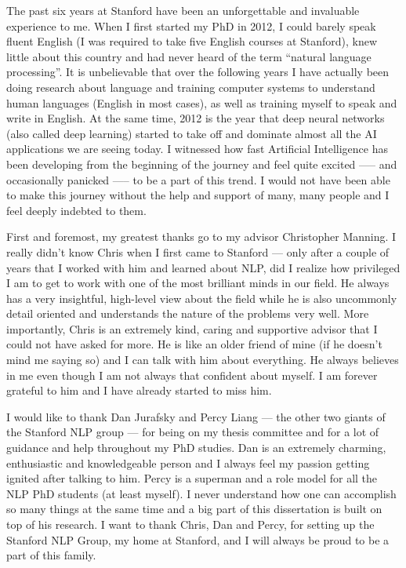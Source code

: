 

The past six years at Stanford have been an unforgettable and invaluable experience to me. When I first started my PhD in 2012, I could barely speak fluent English (I was required to take five English courses at Stanford), knew little about this country and had never heard of the term ``natural language processing''.  It is unbelievable that over the following years I have actually been doing research about language and training computer systems to understand human languages (English in most cases), as well as training myself to speak and write in English. At the same time, 2012 is the year that deep neural networks (also called deep learning) started to take off and dominate almost all the AI applications we are seeing today. I witnessed how fast Artificial Intelligence has been developing from the beginning of the journey and feel quite excited —-- and occasionally panicked —-- to be a part of this trend. I would not have been able to make this journey without the help and support of many, many people and I feel deeply indebted to them.

First and foremost, my greatest thanks go to my advisor Christopher Manning. I really didn't know Chris when I first came to Stanford --- only after a couple of years that I worked with him and learned about NLP, did I realize how privileged I am to get to work with one of the most brilliant minds in our field. He always has a very insightful, high-level view about the field while he is also uncommonly detail oriented and understands the nature of the problems very well. More importantly, Chris is an extremely kind, caring and supportive advisor that I could not have asked for more. He is like an older friend of mine (if he doesn't mind me saying so) and I can talk with him about everything. He always believes in me even though I am not always that confident about myself. I am forever grateful to him and I have already started to miss him.

I would like to thank Dan Jurafsky and Percy Liang --- the other two giants of the Stanford NLP group --- for being on my thesis committee and for a lot of guidance and help throughout my PhD studies. Dan is an extremely charming, enthusiastic and knowledgeable person and I always feel my passion getting ignited after talking to him. Percy is a superman and a role model for all the NLP PhD students (at least myself). I never understand how one can accomplish so many things at the same time and a big part of this dissertation is built on top of his research. I want to thank Chris, Dan and Percy, for setting up the Stanford NLP Group, my home at Stanford, and I will always be proud to be a part of this family.

